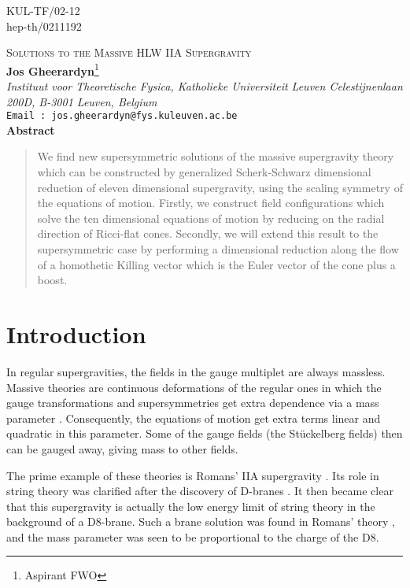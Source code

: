 \documentclass[a4paper,12pt]{article}
\begin{document}
\setcounter{page}{0}
\thispagestyle{empty}
\begin{flushright}
KUL-TF/02-12\\
hep-th/0211192\\[4cm]
\end{flushright}
\begin{center}
{\Large \textsc{Solutions to the Massive HLW IIA Supergravity}}\\[2cm]
{\bf Jos Gheerardyn}\footnote{Aspirant FWO}\\
\vspace{1cm}
\textit{Instituut voor Theoretische Fysica, Katholieke Universiteit Leuven \break
Celestijnenlaan 200D, B-3001 Leuven, Belgium}\\[.5cm]
\texttt{Email : jos.gheerardyn@fys.kuleuven.ac.be}\\[4cm]
{\bf Abstract}\\[.5cm]
\begin{quote}
{\small We find new supersymmetric solutions of the massive supergravity theory which can be constructed by generalized
Scherk-Schwarz dimensional reduction of eleven dimensional supergravity, using the scaling symmetry of the
equations of motion. Firstly, we construct field configurations which solve the ten dimensional equations of motion by reducing on the radial direction of Ricci-flat cones. Secondly, we will extend this result to the supersymmetric case by performing a dimensional reduction along the flow of a homothetic Killing vector which is the Euler vector of the cone plus a boost.}
\end{quote}
\end{center}
\newpage
\section{Introduction}
In regular supergravities, the fields in the gauge multiplet are always massless. Massive theories are continuous deformations of the regular ones in which the gauge transformations and supersymmetries get extra dependence via a mass parameter \coordHE{}. Consequently, the equations of motion get extra terms linear and quadratic in this parameter. Some of the gauge fields (the St\"uckelberg fields) then can be gauged away, giving mass to other fields.

The prime example of these theories is Romans' IIA supergravity \cite{Romans:1986tz}. Its role in string theory was clarified after the discovery of D-branes \cite{Polchinski:1995mt}. It then became clear that this supergravity is actually the low energy limit of string theory in the background of a D8-brane. Such a brane solution was found in Romans' theory \cite{Polchinski:1996df,Bergshoeff:1996ui}, and the mass parameter was seen to be proportional to the charge of the D8.
    
\end{document}
